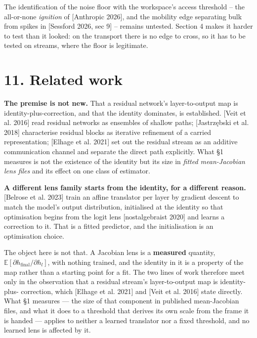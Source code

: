 \documentclass[10pt,letterpaper,twocolumn]{article}
\begin{document}
The identification of the noise floor with the workspace's access threshold -- the all-or-none \emph{ignition} of {[}Anthropic 2026{]}, and the mobility edge separating bulk from spikes in {[}Sessford 2026, sec 9{]} -- remains untested. Section 4 makes it harder to test than it looked: on the transport there is no edge to cross, so it has to be tested on streams, where the floor is legitimate.

\section{11. Related work}\label{11-related-work}

\textbf{The premise is not new.} That a residual network's layer-to-output map is identity\allowbreak{}-\allowbreak{}plus-\allowbreak{}correcti\allowbreak{}on,
and that the identity dominates, is established. {[}Veit et al. 2016{]} read residual networks as
ensembles of shallow paths; {[}Jastrzębski et al. 2018{]} characterise residual blocks as iterative
refinement of a carried representation; {[}Elhage et al. 2021{]} set out the residual stream as an
additive communication channel and separate the direct path explicitly. What §1 measures is not the
existence of the identity but its size in \emph{fitted mean-Jacobian lens files} and its effect on one
class of estimator.

\textbf{A different lens family starts from the identity, for a different reason.} {[}Belrose et al. 2023{]}
train an affine translator per layer by gradient descent to match the model's output distribution,
initialised at the identity so that optimisation begins from the logit lens
{[}nostalgebraist 2020{]} and learns a correction to it. That is a fitted predictor, and the
initialisation is an optimisation choice.

The object here is not that. A Jacobian lens is a \textbf{measured} quantity,
\(\mathbb{E}[\partial h_{\text{final}}/\partial h_l]\), with nothing trained, and the identity in it
is a property of the map rather than a starting point for a fit. The two lines of work therefore
meet only in the observation that a residual stream's layer-to-output map is identity-plus-
correction, which {[}Elhage et al. 2021{]} and {[}Veit et al. 2016{]} state directly. What §1 measures ---
the size of that component in published mean-Jacobian files, and what it does to a threshold that
derives its own scale from the frame it is handed --- applies to neither a learned translator nor a
fixed threshold, and no learned lens is affected by it.
\end{document}
